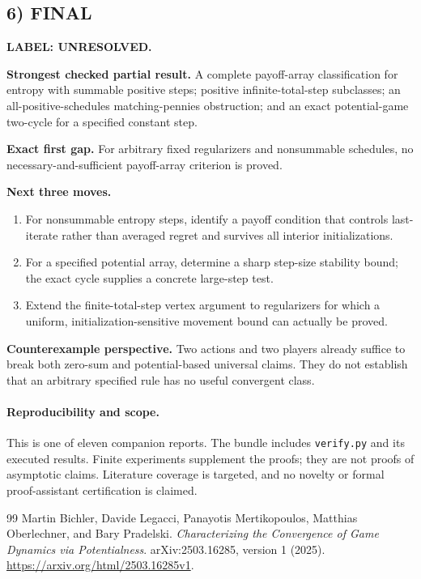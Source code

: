 \documentclass[11pt,a4paper]{article}
\theoremstyle{definition}
\theoremstyle{remark}
\begin{document}
\subsection*{6) FINAL}
\textbf{LABEL: UNRESOLVED.}

\textbf{Strongest checked partial result.} A complete payoff-array classification for
entropy with summable positive steps; positive infinite-total-step subclasses; an
all-positive-schedules matching-pennies obstruction; and an exact potential-game
two-cycle for a specified constant step.

\textbf{Exact first gap.} For arbitrary fixed regularizers and nonsummable schedules,
no necessary-and-sufficient payoff-array criterion is proved.

\textbf{Next three moves.}
\begin{enumerate}[nosep]
\item For nonsummable entropy steps, identify a payoff condition that controls
last-iterate rather than averaged regret and survives all interior initializations.
\item For a specified potential array, determine a sharp step-size stability bound;
the exact cycle supplies a concrete large-step test.
\item Extend the finite-total-step vertex argument to regularizers for which a
uniform, initialization-sensitive movement bound can actually be proved.
\end{enumerate}
\textbf{Counterexample perspective.} Two actions and two players already suffice to
break both zero-sum and potential-based universal claims. They do not establish
that an arbitrary specified rule has no useful convergent class.

\paragraph{Reproducibility and scope.} This is one of eleven companion reports. The bundle includes \texttt{verify.py} and its executed results. Finite experiments supplement the proofs; they are not proofs of asymptotic claims. Literature coverage is targeted, and no novelty or formal proof-assistant certification is claimed.

\begin{thebibliography}{99}
\small
{}
Martin Bichler, Davide Legacci, Panayotis Mertikopoulos, Matthias Oberlechner, and Bary Pradelski.
\emph{Characterizing the Convergence of Game Dynamics via Potentialness}.
arXiv:2503.16285, version 1 (2025).
\url{https://arxiv.org/html/2503.16285v1}.

\end{thebibliography}
\end{document}
